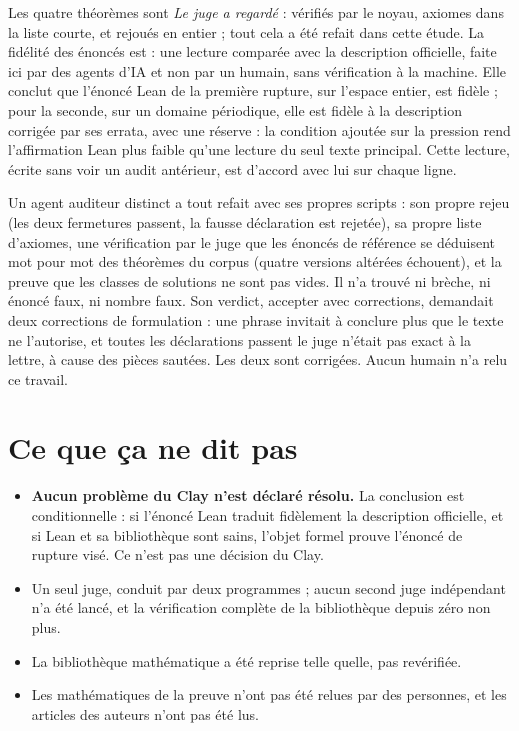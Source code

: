 Les quatre théorèmes sont  \emph{Le juge a regardé} : vérifiés par le noyau, axiomes dans
la liste courte, et rejoués en entier ; tout cela a été refait dans cette étude. La fidélité des énoncés est  : une lecture comparée avec la description
officielle, faite ici par des agents d'IA et non par un humain, sans vérification à la machine. Elle conclut que l'énoncé Lean de la première rupture,
sur l'espace entier, est fidèle ; pour la seconde, sur un domaine périodique, elle est fidèle à
la description corrigée par ses errata, avec une réserve : la condition ajoutée sur la pression
rend l'affirmation Lean plus faible qu'une lecture du seul texte principal. Cette lecture, écrite
sans voir un audit antérieur, est d'accord avec lui sur chaque ligne.

Un agent auditeur distinct a tout refait avec ses propres scripts : son propre rejeu (les deux
fermetures passent, la fausse déclaration est rejetée), sa propre liste d'axiomes, une
vérification par le juge que les énoncés de référence se déduisent mot pour mot des théorèmes du
corpus (quatre versions altérées échouent), et la preuve que les classes de solutions ne sont pas
vides. Il n'a trouvé ni brèche, ni énoncé faux, ni nombre faux. Son verdict, \og accepter avec
corrections\fg{}, demandait deux corrections de formulation : une phrase invitait à conclure plus
que le texte ne l'autorise, et \og toutes les déclarations passent le juge\fg{} n'était pas exact
à la lettre, à cause des pièces sautées. Les deux sont corrigées. Aucun humain n'a relu ce
travail.

\section*{Ce que ça ne dit pas}

\begin{limite}
\begin{itemize}
\item \textbf{Aucun problème du Clay n'est déclaré résolu.} La conclusion est conditionnelle : si
  l'énoncé Lean traduit fidèlement la description officielle, et si Lean et sa bibliothèque sont
  sains, l'objet formel prouve l'énoncé de rupture visé. Ce n'est pas une décision du Clay.
\item Un seul juge, conduit par deux programmes ; aucun second juge indépendant n'a été lancé, et
  la vérification complète de la bibliothèque depuis zéro non plus.
\item La bibliothèque mathématique a été reprise telle quelle, pas revérifiée.
\item Les mathématiques de la preuve n'ont pas été relues par des personnes, et les articles des
  auteurs n'ont pas été lus.
\end{itemize}
\end{limite}

